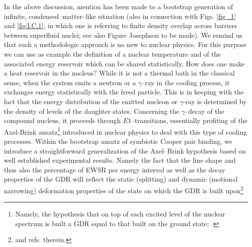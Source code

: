 In the above discussion, mention has been made to a bootstrap generation of infinite, condensed--matter--like situation (also  in connection with Figs. \ref{fig_1} and \ref{fig3.C.1}, in which one is referring to finite density overlap across barriers between superfluid nuclei; see also Figure Josephson to be made). We remind us that such a methodologic approach is no new to nuclear physics. For this purpose we can use as example the definition of a nuclear temperature and of the associated energy reservoir which can be shared statistically. How does one make a heat reservoir in the nucleus? While it is not a thermal bath in the classical sense, when the system emits a neutron or a $\gamma$--ray in the cooling process, it exchanges energy statistically with the freed particle. This is in keeping with the fact that the energy distribution of the emitted nucleon or $\gamma$-ray is determined by the density of levels of the daughter states. Concerning the $\gamma$--decay of the compound nucleus, it proceeds through $E1$--transitions, essentially profiting of the Axel-Brink ansatz\footnote{Namely, the hypothesis that on top of each excited level of the nuclear spectrum is built a GDR equal to that built on the ground state; \cite{Axel:62,Brink:55}.} introduced in nuclear physics to deal with this type of cooling processes.
Within the bootstrap ansatz of symbiotic Cooper pair binding, we introduce a straightforward generalization of the Axel--Brink hypothesis based on  well established experimental    results. Namely the fact that the line shape and thus also the percentage of EWSR per energy interval as well as the decay properties of the GDR will reflect the static (splitting) and dynamic (motional narrowing) deformation properties of the state on which the GDR is built upon\footnote{\cite{LeTourneaux:65,Bohr:75,Bortignon:98} and refs. therein.}

